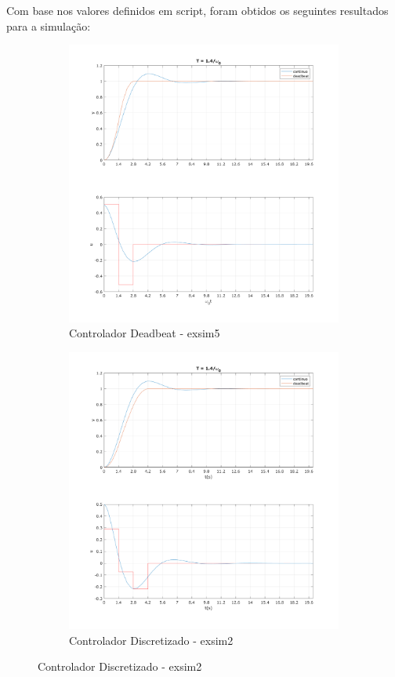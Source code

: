 \documentclass[a4paper,11pt]{article}
\begin{document}
Com base nos valores definidos em script, foram obtidos os seguintes resultados para a simulação:

\begin{figure}[H]
    \centering
    \begin{subfigure}[m]{0.49\linewidth}
        \centering
        \includegraphics[width=1\linewidth]{img/exsim5-deadbeat-sim.png}
        \caption{Controlador Deadbeat - exsim5}
    \end{subfigure}
    \hfill
    \begin{subfigure}[m]{0.49\linewidth}
        \centering
        \includegraphics[width=1\linewidth]{img/exsim5-exsim2-sim.png}
        \caption{Controlador Discretizado - exsim2}
    \end{subfigure}
\end{figure}
\end{document}
